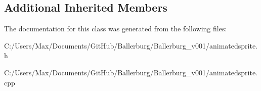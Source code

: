 \subsection*{Additional Inherited Members}


The documentation for this class was generated from the following files\+:\begin{DoxyCompactItemize}
\item 
C\+:/\+Users/\+Max/\+Documents/\+Git\+Hub/\+Ballerburg/\+Ballerburg\+\_\+v001/animatedsprite.\+h\item 
C\+:/\+Users/\+Max/\+Documents/\+Git\+Hub/\+Ballerburg/\+Ballerburg\+\_\+v001/animatedsprite.\+cpp\end{DoxyCompactItemize}
